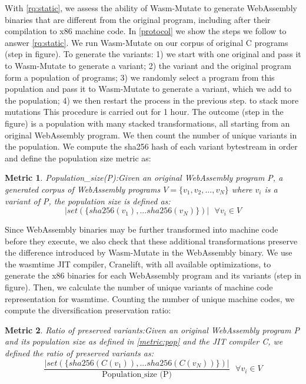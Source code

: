 \documentclass[a4paper,fleqn]{cas-dc}
\newcommand{\tool}{{\sc Wasm-Mutate}\xspace}
\newcommand{\Wasm}{WebAssembly\xspace}
\newcommand{\wasm}{\Wasm}
\newtheorem{metric}{Metric}
\newcommand*\step[1]{
\noindent\tikz[baseline=(char.base)]{
        \node[shape=circle,text=black,draw=black, fill=white,inner sep=1.2pt] (char) {#1};}}
\begin{document}
With \ref{rq:static},
we assess the ability of \tool to generate \Wasm binaries that are different from the original program, including after their compilation to x86 machine code.
In \autoref{protocol} we show the steps we follow to answer \ref{rq:static}.
We run \tool on our corpus of \nProgramsRosetta{} original C programs (step \step{1} in figure). 
To generate the variants:
1) we start with one original and pass it to \tool to generate a variant;  
2) the variant and the original program form a population of programs; 
3) we randomly select a program from this population and pass it to \tool to generate a variant, which we add to the population; 
4) we then restart the process in the previous step. to stack more mutations 
This procedure is carried out for 1 hour.
The outcome (step \step{2} in the figure) is a population with many stacked transformations, all starting from an original \wasm program.
We then count the number of unique variants in the population.
We compute the sha256 hash of each variant bytestream in order and define the population size metric as: 


\begin{metric}{Population\_size(P):}\label{metric:pop}
Given an original \wasm program P, a generated corpus of \wasm programs $V=\{v_1, v_2, ..., v_N\}$ where $v_i$ is a variant of P, the population size is defined as:
$$
    | set(\{ sha256(v_1), ... sha256(v_N) \})|\text{ }\forall v_i \in V 
$$
\end{metric}


Since \wasm binaries may be further transformed into machine code before they execute, we also check that these additional transformations preserve the difference introduced by \tool in the \wasm binary. 
We use the wasmtime JIT compiler, Cranelift, with all available optimizations, to generate the x86 binaries for each \wasm program and its variants  (step \step{3} in figure). 
Then, we calculate the number of unique variants of machine code representation for wasmtime.
Counting the number of unique machine codes, we compute the diversification preservation ratio: \\

\begin{metric}{Ratio of preserved variants:}\label{metric:preservation}
    Given an original \wasm program P and its population size as defined in \autoref{metric:pop} and the JIT compiler C, we defined the ratio of preserved variants as:
    $$
        \frac{ | set(\{ sha256(C(v_1)), ... sha256(C(v_N)) \})|}{ \text{Population\_size (P)}} \text{ }\forall v_i \in V 
    $$

    
\end{metric}
\end{document}
